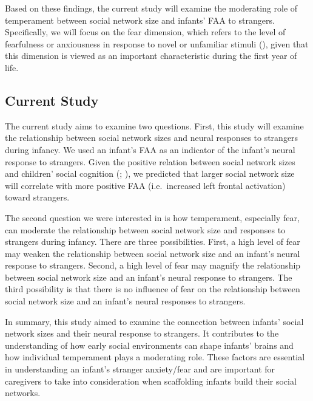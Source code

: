 \documentclass[
  man,
  floatsintext,
  longtable,
  nolmodern,
  notxfonts,
  notimes,
  colorlinks=true,linkcolor=blue,citecolor=blue,urlcolor=blue]{apa7}
\begin{document}
Based on these findings, the current study will examine the moderating
role of temperament between social network size and infants' FAA to
strangers. Specifically, we will focus on the fear dimension, which
refers to the level of fearfulness or anxiousness in response to novel
or unfamiliar stimuli
(), given that this dimension is viewed as an important
characteristic during the first year of life.

\subsection{Current Study}\label{current-study}

The current study aims to examine two questions. First, this study will
examine the relationship between social network sizes and neural
responses to strangers during infancy. We used an infant's FAA as an
indicator of the infant's neural response to strangers. Given the
positive relation between social network sizes and children' social
cognition (; ), we predicted that larger social network size will correlate with
more positive FAA (i.e.~increased left frontal activation) toward
strangers.

The second question we were interested in is how temperament, especially
fear, can moderate the relationship between social network size and
responses to strangers during infancy. There are three possibilities.
First, a high level of fear may weaken the relationship between social
network size and an infant's neural response to strangers. Second, a
high level of fear may magnify the relationship between social network
size and an infant's neural response to strangers. The third possibility
is that there is no influence of fear on the relationship between social
network size and an infant's neural responses to strangers.

In summary, this study aimed to examine the connection between infants'
social network sizes and their neural response to strangers. It
contributes to the understanding of how early social environments can
shape infants' brains and how individual temperament plays a moderating
role. These factors are essential in understanding an infant's stranger
anxiety/fear and are important for caregivers to take into consideration
when scaffolding infants build their social networks.
\end{document}
